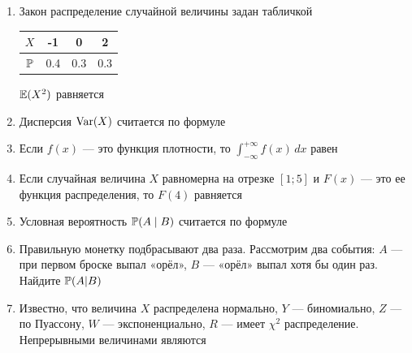 \documentclass[12pt, a4paper]{article}\usepackage[]{graphicx}\usepackage[]{color}
\begin{document}
\begin{enumerate}
\item Закон распределение случайной величины задан табличкой


\begin{tabular}{c|ccc}
$X$ & -1 & 0 & 2 \\
\hline
$\P$ & 0.4 & 0.3 & 0.3 \\
\end{tabular}


$\E(X^2)$ равняется


\item Дисперсия $\Var(X)$ считается по формуле


\item Если $f(x)$ — это функция плотности, то $\int_{-\infty}^{+\infty}f(x)\,dx$ равен



\item Если случайная величина $X$ равномерна на отрезке $[1;5]$ и $F(x)$ — это ее функция распределения, то $F(4)$ равняется


\item Условная вероятность $\P(A\mid B)$ считается по формуле


\item Правильную монетку подбрасывают два раза. Рассмотрим два события: $A$ — при первом броске выпал «орёл», $B$ — «орёл» выпал хотя бы один раз. Найдите $\P(A|B)$



\item Известно, что величина $X$ распределена нормально, $Y$ — биномиально, $Z$ — по Пуассону, $W$ — экспоненциально, $R$ — имеет $\chi^2$ распределение. Непрерывными величинами являются



\end{enumerate}
\end{document}
